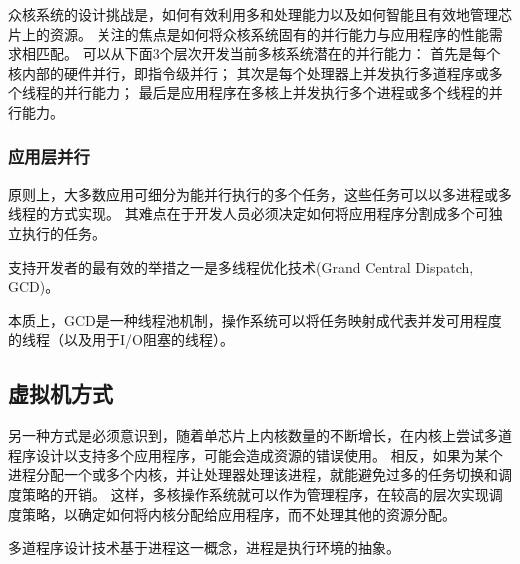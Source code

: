 {{        众核系统的设计挑战是，如何有效利用多和处理能力以及如何智能且有效地管理芯片上的资源。
        关注的焦点是如何将众核系统固有的并行能力与应用程序的性能需求相匹配。
        可以从下面3个层次开发当前多核系统潜在的并行能力：
        首先是每个核内部的硬件并行，即指令级并行；
        其次是每个处理器上并发执行多道程序或多个线程的并行能力；
        最后是应用程序在多核上并发执行多个进程或多个线程的并行能力。

        \subsubsection{应用层并行}
        {
            原则上，大多数应用可细分为能并行执行的多个任务，这些任务可以以多进程或多线程的方式实现。
            其难点在于开发人员必须决定如何将应用程序分割成多个可独立执行的任务。

            支持开发者的最有效的举措之一是多线程优化技术(Grand Central Dispatch, GCD)。

            本质上，GCD是一种线程池机制，操作系统可以将任务映射成代表并发可用程度的线程（以及用于I/O阻塞的线程）。
        }

        \subsection{虚拟机方式}
        {
            另一种方式是必须意识到，随着单芯片上内核数量的不断增长，在内核上尝试多道程序设计以支持多个应用程序，可能会造成资源的错误使用。
            相反，如果为某个进程分配一个或多个内核，并让处理器处理该进程，就能避免过多的任务切换和调度策略的开销。
            这样，多核操作系统就可以作为管理程序，在较高的层次实现调度策略，以确定如何将内核分配给应用程序，而不处理其他的资源分配。

            多道程序设计技术基于进程这一概念，进程是执行环境的抽象。
        }
    }
}
